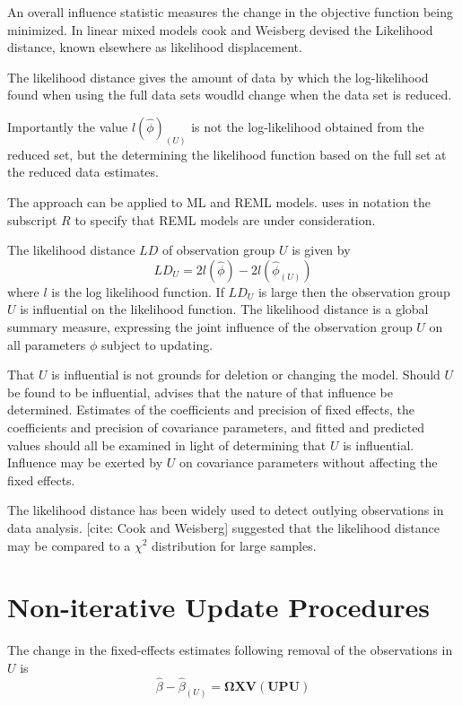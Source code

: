 \documentclass[12pt, a4paper]{report}
\theoremstyle{plain}
\theoremstyle{definition}
\theoremstyle{remark}
\begin{document}
An overall influence statistic measures the change in the objective function being minimized.
In linear mixed models cook and Weisberg devised the Likelihood distance, known elsewhere as likelihood displacement.

The likelihood distance gives the amount of data by which the log-likelihood found when using the full data sets woudld change when the data set is reduced.

Importantly the value $l(\hat{\phi})_{(U)}$ is not the log-likelihood obtained from the reduced set, but the determining the likelihood function based on the full set at the reduced data estimates.

The approach can be applied to ML and REML models. \citet{schabenberger} uses in notation the subscript $R$ to specify that REML models are under consideration.

The likelihood distance $LD$ of observation group $U$ is given by
\begin{equation}
LD_{U} = 2l(\hat{\phi}) - 2l(\hat{\phi}_{(U)})
\end{equation}
where $l$ is the log likelihood function. If $LD_{U}$ is large then the observation group $U$ is influential on the likelihood function. The likelihood distance is a global summary measure, expressing the joint influence of the observation group $U$ on all parameters $\phi$ subject to updating.

That $U$ is influential is not grounds for deletion or changing the model. Should $U$ be found to be influential, \citet{schabenberger} advises that the nature of that influence be determined. Estimates of the coefficients and precision of fixed effects, the coefficients and precision of covariance parameters, and fitted and predicted values should all be examined in light of determining that $U$ is influential.
Influence may be exerted by $U$ on covariance parameters without affecting the fixed effects.

The likelihood distance has been widely used to detect outlying observations in data analysis.
[cite: Cook and Weisberg] suggested that the likelihood distance may be compared to a $\chi^2$ distribution for large samples.
\section{Non-iterative Update Procedures}


The change in the fixed-effects estimates following removal of the observations in $U$ is
\[ \hat{\beta} - \hat{\beta}_{(U)} = \boldsymbol{\Omega}\boldsymbol{X}\boldsymbol{V}
\left( \boldsymbol{U} \boldsymbol{P}\boldsymbol{U}\right)   \]
\end{document}
